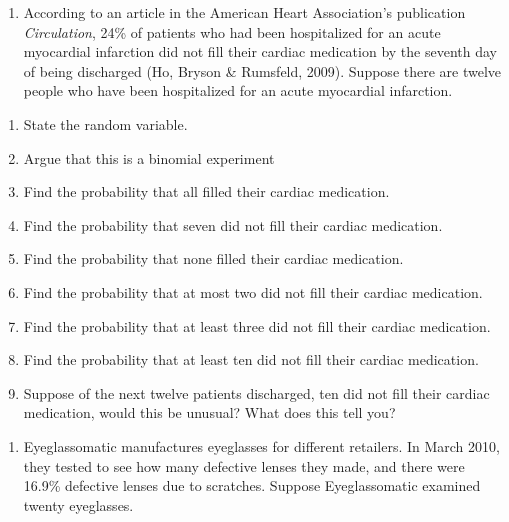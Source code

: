 \documentclass[]{book}
\providecommand{\tightlist}{%
  \setlength{\itemsep}{0pt}\setlength{\parskip}{0pt}}
\begin{document}
\begin{enumerate}
\def\labelenumi{\arabic{enumi}.}
\setcounter{enumi}{1}
\tightlist
\item
  According to an article in the American Heart Association's publication \emph{Circulation}, 24\% of patients who had been hospitalized for an acute myocardial infarction did not fill their cardiac medication by the seventh day of being discharged (Ho, Bryson \& Rumsfeld, 2009). Suppose there are twelve people who have been hospitalized for an acute myocardial infarction.
\end{enumerate}

\begin{enumerate}
\def\labelenumi{\alph{enumi}.}
\tightlist
\item
  State the random variable.
\item
  Argue that this is a binomial experiment
\item
  Find the probability that all filled their cardiac medication.
\item
  Find the probability that seven did not fill their cardiac medication.
\item
  Find the probability that none filled their cardiac medication.
\item
  Find the probability that at most two did not fill their cardiac medication.
\item
  Find the probability that at least three did not fill their cardiac medication.
\item
  Find the probability that at least ten did not fill their cardiac medication.
\item
  Suppose of the next twelve patients discharged, ten did not fill
  their cardiac medication, would this be unusual? What does this tell
  you?
\end{enumerate}

\begin{enumerate}
\def\labelenumi{\arabic{enumi}.}
\setcounter{enumi}{2}
\tightlist
\item
  Eyeglassomatic manufactures eyeglasses for different retailers. In
  March 2010, they tested to see how many defective lenses they made,
  and there were 16.9\% defective lenses due to scratches. Suppose
  Eyeglassomatic examined twenty eyeglasses.
\end{enumerate}
\end{document}
